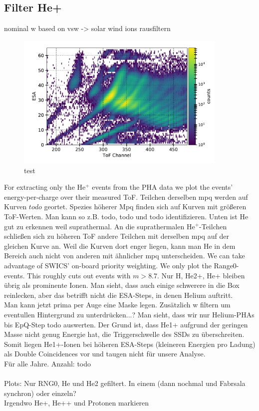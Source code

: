 \subsection{Filter He+}
nominal w based on vsw -> solar wind ions rausfiltern
\begin{figure}[h]
	\includegraphics[width=0.9\textwidth]{Figures/epq_all.pdf}
	\centering
	\caption{test}
	\label{fig:epq_all}
\end{figure}


For extracting only the $\mathrm{He^{+}}$ events from the PHA data we plot the events' energy-per-charge over their measured ToF. 
Teilchen derselben mpq werden auf Kurven $todo$ geortet. Spezies höherer Mpq finden sich auf Kurven mit größeren ToF-Werten. Man kann so z.B. todo, todo und todo identifizieren. Unten ist He gut zu erkennen weil suprathermal. An die suprathermalen $\mathrm{He^{+}}$-Teilchen schließen sich zu höheren ToF andere Teilchen mit derselben mpq auf der gleichen Kurve an. Weil die Kurven dort enger liegen, kann man He in dem Bereich auch nicht von anderen mit ähnlicher mpq unterscheiden.
We can take advantage of SWICS' on-board priority weighting. We only plot the Range0-events. This roughly cuts out events with $m>8.7$. Nur H, He2+, He+ bleiben übrig als prominente Ionen. Man sieht, dass auch einige schwerere in die Box reinlecken, aber das betrifft nicht die ESA-Steps, in denen Helium auftritt.\\
Man kann jetzt prima per Auge eine Maske legen. Zusätzlich w filtern um eventullen Hintergrund zu unterdrücken...?
Man sieht, dass wir nur Helium-PHAs bis EpQ-Step todo auswerten. Der Grund ist, dass He1+ aufgrund der geringen Masse nicht genug Energie hat, die Triggerschwelle des SSDs zu überschreiten. Somit liegen He1+-Ionen bei höheren ESA-Steps (kleineren Energien pro Ladung) als Double Coincidences vor und taugen nicht für unsere Analyse.
\\
Für alle Jahre. Anzahl: todo
\\ \\
Plots: Nur RNG0, He und He2 gefiltert. In einem (dann nochmal und Fabrsala synchron) oder einzeln?
\\
Irgendwo He+, He++ und Protonen markieren



